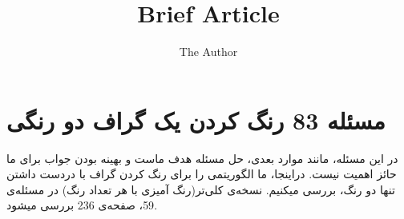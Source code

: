 \documentclass{book} %
\title{Brief Article}
\author{The Author}
\begin{document}
\maketitle

\section{مسئله 83 رنگ کردن یک گراف دو رنگی}

در این مسئله، مانند موارد بعدی، حل مسئله هدف ماست و بهینه بودن جواب برای ما حائز اهمیت نیست. دراینجا، ما الگوریتمی را برای رنگ کردن گراف با دردست داشتن تنها دو رنگ، بررسی میکنیم. نسخه‌ی کلی‌تر(رنگ آمیزی با هر تعداد رنگ) در مسئله‌ی 59، صفحه‌ی 236 بررسی میشود.

\end{document}
